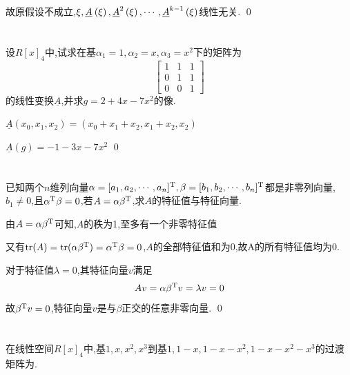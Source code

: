 \documentclass{matrix-homework}
\begin{document}
故原假设不成立,$\xi,\underline{A}^{}\left(\xi\right),\underline{A}^{2}\left(\xi\right),\cdots,\underline{A}^{k-1}\left(\xi\right)$线性无关.
\qed

\section{}
设$R[x]_4$中,试求在基$\alpha_1=1,\alpha_2=x,\alpha_3=x^2$下的矩阵为
\begin{equation*}
    \begin{bmatrix}
        1 & 1 & 1 \\
        0 & 1 & 1 \\
        0 & 0 & 1
    \end{bmatrix}
\end{equation*}
的线性变换$\underline{A}$,并求$g=2+4x-7x^2$的像.

\answer
$\underline{A}(x_0,x_1,x_2)=(x_0+x_1+x_2, x_1+x_2, x_2)$

$\underline{A}(g)=-1-3x-7x^2$
\qed

\section{}
已知两个$n$维列向量$\alpha=[a_1,a_2,\cdots,a_n]^{\mathrm{T}},\beta=[b_1,b_2,\cdots,b_n]^{\mathrm{T}}$都是非零列向量,$b_1\ne0$,且$\alpha^{\mathrm{T}}\beta=0$,若$A=\alpha\beta^{\mathrm{T}}$,求$A$的特征值与特征向量.

\answer
由$A=\alpha\beta^{\mathrm{T}}$可知,$A$的秩为1,至多有一个非零特征值

又有$\mathrm{tr}(A) = \mathrm{tr}(\alpha\beta^{\mathrm{T}}) = \alpha^{\mathrm{T}}\beta=0$,$A$的全部特征值和为0,故A的所有特征值均为0.

对于特征值$\lambda=0$,其特征向量$v$满足
$$Av=\alpha\beta^{\mathrm{T}} v=\lambda v=0$$
故$\beta^{\mathrm{T}} v=0$,特征向量$v$是与$\beta$正交的任意非零向量.
\qed

\section{}
在线性空间$R[x]_4$中,基$1,x,x^2,x^3$到基$1,1-x,1-x-x^2,1-x-x^2-x^3$的过渡矩阵为.
\end{document}
